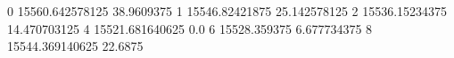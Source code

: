 0 15560.642578125 38.9609375
1 15546.82421875 25.142578125
2 15536.15234375 14.470703125
4 15521.681640625 0.0
6 15528.359375 6.677734375
8 15544.369140625 22.6875
